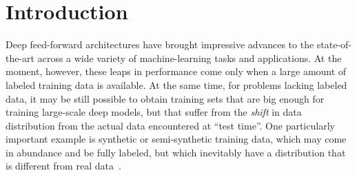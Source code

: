\section{Introduction}

Deep feed-forward architectures have brought impressive advances to the state-of-the-art across a wide variety of machine-learning tasks and applications. At the moment, however, these leaps in performance come only when a large amount of labeled training data is available. At the same time, for problems lacking labeled data, it may be still possible to obtain training sets that are big enough for training large-scale deep models, but that suffer from the {\em shift} in data distribution from the actual data encountered at ``test time''. One particularly important example is synthetic or semi-synthetic training data, which may come in abundance and be fully labeled, but which inevitably have a distribution that is different from real data~\cite{Liebelt10,Stark10,Vazquez14,Sun14}.





 

